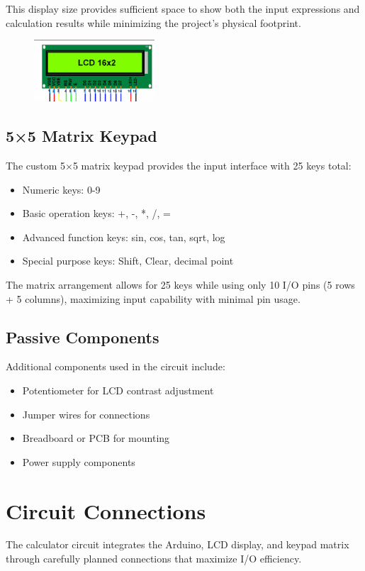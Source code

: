 \documentclass[12pt]{article}
\begin{document}
	This display size provides sufficient space to show both the input expressions and calculation results while minimizing the project's physical footprint.
	\begin{figure}[h]
		\centering
		\includegraphics[width=0.4\textwidth]{figs/lcd.png}
	\end{figure}
	\subsection{5×5 Matrix Keypad}
	The custom 5×5 matrix keypad provides the input interface with 25 keys total:
	\begin{itemize}
		\item Numeric keys: 0-9
		\item Basic operation keys: +, -, *, /, =
		\item Advanced function keys: sin, cos, tan, sqrt, log
		\item Special purpose keys: Shift, Clear, decimal point
	\end{itemize}
	
	The matrix arrangement allows for 25 keys while using only 10 I/O pins (5 rows + 5 columns), maximizing input capability with minimal pin usage.
	
	\subsection{Passive Components}
	Additional components used in the circuit include:
	\begin{itemize}
		\item Potentiometer for LCD contrast adjustment
		\item Jumper wires for connections
		\item Breadboard or PCB for mounting
		\item Power supply components
	\end{itemize}
	
	\section{Circuit Connections}
	The calculator circuit integrates the Arduino, LCD display, and keypad matrix through carefully planned connections that maximize I/O efficiency.
	
\end{document}
